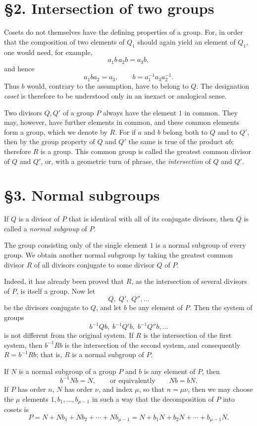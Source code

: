 \documentclass[11pt]{article}
\begin{document}
\bigskip

\clearpage

\section*{§2. Intersection of two groups}
Cosets do not themselves have the defining properties of a group. For, in order that the composition of two elements of $Q_1$ should again yield an element of $Q_1$, one would need, for example,
\[
 a_1 b\, a_2 b = a_3 b,
\]
and hence
\[
 a_1 b a_2 = a_3,
 \qquad
 b = a_1^{-1} a_3 a_2^{-1}.
\]
Thus $b$ would, contrary to the assumption, have to belong to $Q$. The designation \emph{coset} is therefore to be understood only in an inexact or analogical sense.

Two divisors $Q,Q'$ of a group $P$ always have the element $1$ in common. They may, however, have further elements in common, and these common elements form a group, which we denote by $R$. For if $a$ and $b$ belong both to $Q$ and to $Q'$, then by the group property of $Q$ and $Q'$ the same is true of the product $ab$; therefore $R$ is a group. This common group is called the greatest common divisor of $Q$ and $Q'$, or, with a geometric turn of phrase, the \emph{intersection} of $Q$ and $Q'$.

\section*{§3. Normal subgroups}
If $Q$ is a divisor of $P$ that is identical with all of its conjugate divisors, then $Q$ is called a \emph{normal subgroup} of $P$.

The group consisting only of the single element $1$ is a normal subgroup of every group. We obtain another normal subgroup by taking the greatest common divisor $R$ of all divisors conjugate to some divisor $Q$ of $P$.

Indeed, it has already been proved that $R$, as the intersection of several divisors of $P$, is itself a group. Now let
\[
 Q,\;Q',\;Q'',\dots
\]
be the divisors conjugate to $Q$, and let $b$ be any element of $P$. Then the system of groups
\[
 b^{-1}Qb,\; b^{-1}Q'b,\; b^{-1}Q''b,\dots
\]
is not different from the original system. If $R$ is the intersection of the first system, then $b^{-1}Rb$ is the intersection of the second system, and consequently $R=b^{-1}Rb$; that is, $R$ is a normal subgroup of $P$.

If $N$ is a normal subgroup of a group $P$ and $b$ is any element of $P$, then
\[
 b^{-1} N b = N,
 \qquad\text{or equivalently}\qquad
 N b = b N.
\]
If $P$ has order $n$, $N$ has order $\nu$, and index $\mu$, so that $n=\mu\nu$, then we may choose the $\mu$ elements $1,b_1,\dots,b_{\mu-1}$ in such a way that the decomposition of $P$ into cosets is
\[
 P = N + N b_1 + N b_2 + \cdots + N b_{\mu-1}
   = N + b_1 N + b_2 N + \cdots + b_{\mu-1} N.
\]
\end{document}
